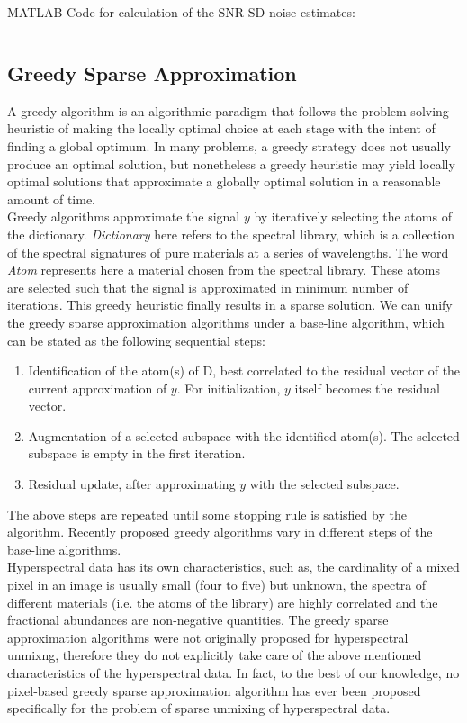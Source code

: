 \documentclass[12pt]{svproc}
\begin{document}
 MATLAB Code for calculation of the SNR-SD noise estimates:\\
\hline
\inputminted{octave}{snr_sd.m}
\hline



\subsection{Greedy Sparse Approximation} 
A greedy algorithm is an algorithmic paradigm that follows the problem solving heuristic of making the locally optimal choice at each stage with the intent of finding a global optimum. In many problems, a greedy strategy does not usually produce an optimal solution, but nonetheless a greedy heuristic may yield locally optimal solutions that approximate a globally optimal solution in a reasonable amount of time.\\

Greedy algorithms approximate the signal $y$ by iteratively selecting the atoms of the dictionary. \emph{Dictionary} here refers to the spectral library, which is a collection of the spectral signatures of pure materials at a series of wavelengths. The word \emph{Atom} represents here a material chosen from the spectral library. These atoms are selected such that the signal is approximated in minimum number of iterations. This greedy heuristic finally results in a sparse solution. We can unify the greedy sparse approximation algorithms under a base-line algorithm, which can be stated as the following sequential steps: 
\begin{enumerate}
	\item Identification of the atom(s) of D, best correlated to the residual vector of the current approximation of $y$. For initialization, $y$ itself becomes the residual vector.
	\item Augmentation of a selected subspace with the identified atom(s). The selected subspace is empty in the first iteration.
	\item  Residual update, after approximating $y$ with
	the selected subspace. 
\end{enumerate}

The above steps are repeated until some stopping rule is satisfied by the algorithm. Recently proposed greedy algorithms vary in different steps of the base-line algorithms. \\

Hyperspectral data has its own characteristics, such  as, the cardinality of a mixed  pixel  in  an  image  is  usually  small (four  to  five)  but  unknown,  the  spectra  of  different  materials (i.e.  the  atoms  of  the  library)  are  highly  correlated  and  the fractional abundances are non-negative quantities. The greedy sparse approximation algorithms were not  originally  proposed  for  hyperspectral  unmixng,  therefore they  do  not  explicitly  take  care  of  the  above  mentioned characteristics of the hyperspectral data. In fact, to the best of our  knowledge,  no  pixel-based  greedy  sparse  approximation algorithm has ever been proposed specifically for the problem of sparse unmixing of hyperspectral data.\\
\end{document}
